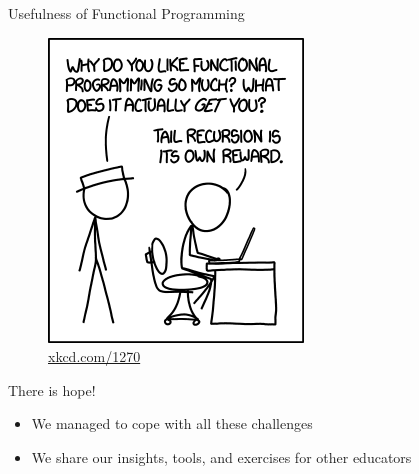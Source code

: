 \documentclass{beamer}
\begin{document}
\begin{frame}{Usefulness of Functional Programming}
{\begin{multicols}{2}
\begin{figure}
\includegraphics[width=0.8\linewidth]{assets/xkcd_tailrec}
\caption*{\url{xkcd.com/1270}}
\end{figure}
\end{multicols}
}
\end{frame}

\begin{frame}
\centerline{\alert{\huge{There is hope!}}}
\begin{itemize}[<+->]
\item We managed to cope with all these challenges
\item We share our insights, tools, and exercises for other educators
\end{itemize}


\vspace{\baselineskip}
\end{frame}
\end{document}
